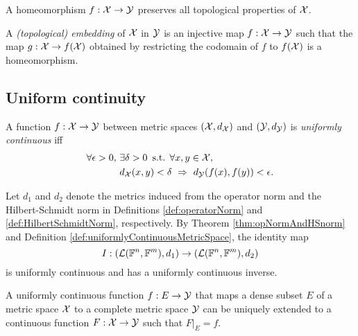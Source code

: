 \begin{coro}
  A homeomorphism $f:{\cal X}\rightarrow {\cal Y}$
  preserves all topological properties of ${\cal X}$. 
\end{coro}

\begin{defn}
  \label{def:topoEmbedding}
  A \emph{(topological) embedding} of ${\cal X}$ in ${\cal Y}$
  is an injective map $f:{\cal X}\rightarrow{\cal Y}$
  such that the map $g:{\cal X}\rightarrow f({\cal X})$
  obtained by restricting the codomain of $f$ to $f({\cal X})$
  is a homeomorphism.
\end{defn}

\subsection{Uniform continuity}

\begin{defn}
  \label{def:uniformlyContinuousMetricSpace}
  A function $f: {\cal X} \rightarrow {\cal Y}$ between
  metric spaces $({\cal X},d_{\cal X})$ and $({\cal Y}, d_{\cal Y})$ 
  is \emph{uniformly continuous}
  iff
  \begin{align}
    \label{eq:uniformlyContinuousMetricSpace}
    \forall \epsilon>0,\
    & \exists \delta>0\, \text{ s.t. }
      \forall x,y \in {\cal X},\ \
    \\ \nonumber
    &d_{\cal X}(x,y)<\delta\ \Rightarrow\ d_{\cal Y}(f(x),f(y))<\epsilon.
  \end{align}
\end{defn}

\begin{exm}
  \label{exm:identityUniformlyCont}
  Let $d_1$ and $d_2$ denote the metrics
  induced from the operator norm and the Hilbert-Schmidt norm
  in Definitions \ref{def:operatorNorm} and
  \ref{def:HilbertSchmidtNorm}, respectively.
  By Theorem \ref{thm:opNormAndHSnorm}
  and Definition \ref{def:uniformlyContinuousMetricSpace}, 
  the identity map
  \begin{equation}
    \label{eq:identityUniformlyCont}
    I: \left({\cal L}(\mathbb{F}^n,\mathbb{F}^m), d_1\right)
    \rightarrow
    \left({\cal L}(\mathbb{F}^n,\mathbb{F}^m), d_2\right)
  \end{equation}
  is uniformly continuous and has a uniformly continuous inverse.
\end{exm}

\begin{thm}
  \label{thm:continuousExt}
  A uniformly continuous function $f: E \rightarrow {\cal Y}$ 
  that maps a dense subset $E$ of a metric space ${\cal X}$
  to a complete metric space ${\cal Y}$
  can be uniquely extended to a continuous function
  $F: {\cal X}\rightarrow {\cal Y}$ such that
  $F|_{E} = f$.
\end{thm}

